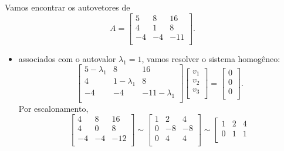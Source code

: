 \begin{ex}
	Vamos encontrar os autovetores de
	\begin{equation}
	A =
	\left[
	\begin{array}{ccc}
	5 & 8 & 16 \\
	4 & 1 & 8 \\
	-4 & -4 & -11 \\
	\end{array}
	\right].
	\end{equation}

	\begin{itemize}
		\item associados com o autovalor $\lambda_1 = 1$, vamos resolver o sistema homogêneo:
		\begin{equation}
		\left[
		\begin{array}{ccc}
		5-\lambda_1 & 8 & 16 \\
		4 & 1-\lambda_1 & 8 \\
		-4 & -4 & -11-\lambda_1 \\
		\end{array}
		\right] \left[
		\begin{array}{ccc}
		v_1 \\
		v_2 \\
		v_3 \\
		\end{array}
		\right] = \left[
		\begin{array}{ccc}
		0 \\
		0 \\
		0 \\
		\end{array}
		\right].
		\end{equation} Por escalonamento,
		\begin{equation}
		\left[
		\begin{array}{ccc}
		4 &  8 & 16 \\
		4 &  0 & 8 \\
		-4 & -4 & -12 \\
		\end{array}
		\right] \sim \left[
		\begin{array}{ccc}
		1 &  2 & 4 \\
		0 & -8 & -8 \\
		0 &  4 & 4 \\
		\end{array}
		\right] \sim \left[
		\begin{array}{ccc}
		1 &  2 & 4 \\
		0 &  1 & 1 \\

\end{array}
\end{equation}
\end{itemize}
\end{ex}
